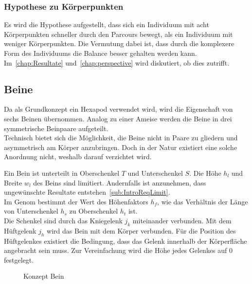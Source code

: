       \subsubsection{Hypothese zu Körperpunkten\label{subsub:hypoKp}}

        Es wird die Hypothese aufgestellt,
        dass sich ein Individuum mit acht Körperpunkten schneller durch den Parcours bewegt,
        als ein Individuum mit weniger Körperpunkten.
        Die Vermutung dabei ist, dass durch die komplexere Form des Individuums die Balance besser gehalten werden kann.
        Im~\vref{chap:Resultate} und~\vref{chap:perspective} wird diskutiert, ob dies zutrifft.

    \subsection{Beine\label{sub:Beine}}

      Da als Grundkonzept ein \gls{Hexapod} verwendet wird, wird die Eigenschaft von sechs Beinen übernommen.
      Analog zu einer Ameise werden die Beine in drei symmetrische Beinpaare aufgeteilt.
      \\
      Technisch bietet sich die Möglichkeit, die Beine nicht in Paare zu gliedern und asymmetrisch am Körper anzubringen.
      Doch in der Natur existiert eine solche Anordnung nicht, weshalb darauf verzichtet wird.

      \medskip

      Ein Bein ist unterteilt in Oberschenkel \(T\) und Unterschenkel \(S\).
      Die Höhe \(h_{l}\) und Breite \(w_{l}\) des Beins sind limitiert.
      Andernfalls ist anzunehmen, dass ungewünschte Resultate entstehen~\vref{sub:IntroReqLimit}.
      \\
      Im Genom bestimmt der Wert des Höhenfaktors \(h_{f}\),
      wie das Verhältnis der Länge von Unterschenkel \(h_{s}\) zu Oberschenkel \(h_{t}\) ist.
      \\
      Die Schenkel sind durch das Kniegelenk \(j_{k}\) miteinander verbunden.
      Mit dem Hüftgelenk \(j_{h}\) wird das Bein mit dem Körper verbunden.
      Für die Position des Hüftgelenkes existiert die Bedingung,
      dass das Gelenk innerhalb der Körperfläche angebracht sein muss.
      Zur Vereinfachung wird die Höhe jedes Gelenkes auf 0 festgelegt.

      \begin{figure}[H]
        \centering
        
        \caption{Konzept Bein\label{fig:conceptLeg}}
      \end{figure}

